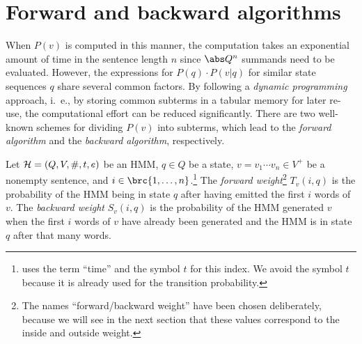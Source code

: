 \section{Forward and backward algorithms}

When $P(v)$ is computed in this manner, the computation takes an exponential
amount of time in the sentence length $n$ since $\abs Q^n$ summands need to be
evaluated. However, the expressions for $P(q)\cdot P(v|q)$ for similar state
sequences $q$ share several common factors. By following a \emph{dynamic
programming} approach, i.~e., by storing common subterms in a tabular memory
for later re-use, the computational effort can be reduced significantly. There
are two well-known schemes for dividing $P(v)$ into subterms, which lead to the
\emph{forward algorithm} and the \emph{backward algorithm}, respectively.

\begin{definition}
 Let $\mathcal H=(Q,V,\#,t,e)$ be an HMM, $q\in Q$ be a state, $v=v_1\cdots v_n\in V^+$
 be a nonempty sentence, and $i\in\brc{1,\ldots,n}$.\footnote{\cite{jm09} uses
 the term ``time'' and the symbol $t$ for this index. We avoid the symbol $t$
 because it is already used for the transition probability.} The \emph{forward
 weight}\footnote{The names ``forward/backward weight'' have been chosen
 deliberately, because we will see in the next section that these values
 correspond to the inside and outside weight.} $T_v(i,q)$ is the probability
 of the HMM being in state $q$ after having emitted the first $i$ words of
 $v$. The \emph{backward weight} $S_v(i,q)$ is the probability of the HMM
 generated $v$ when the first $i$ words of $v$ have already been generated and
 the HMM is in state $q$ after that many words.
\end{definition}

